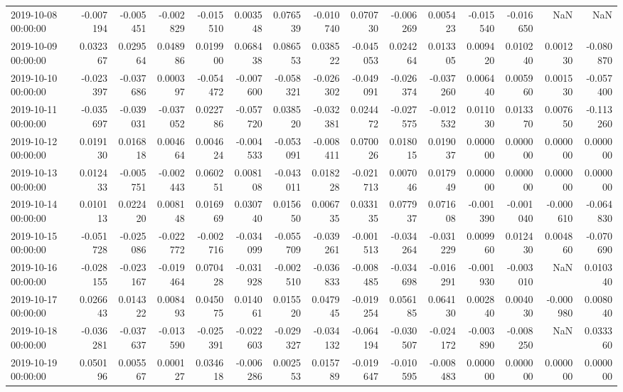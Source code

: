 \begin{tabular}{lrrrrrrrrrrrrrr}
2019-10-08 00:00:00 & -0.007194 & -0.005451 & -0.002829 & -0.015510 & 0.003548 & 0.076539 & -0.010740 & 0.070730 & -0.006269 & 0.005423 & -0.015540 & -0.016650 & NaN & NaN \\
2019-10-09 00:00:00 & 0.032367 & 0.029564 & 0.048986 & 0.019900 & 0.068438 & 0.086553 & 0.038522 & -0.045053 & 0.024264 & 0.013305 & 0.009420 & 0.010240 & 0.001230 & -0.080870 \\
2019-10-10 00:00:00 & -0.023397 & -0.037686 & 0.000397 & -0.054472 & -0.007600 & -0.058321 & -0.026302 & -0.049091 & -0.026374 & -0.037260 & 0.006440 & 0.005960 & 0.001530 & -0.057400 \\
2019-10-11 00:00:00 & -0.035697 & -0.039031 & -0.037052 & 0.022786 & -0.057720 & 0.038520 & -0.032381 & 0.024472 & -0.027575 & -0.012532 & 0.011030 & 0.013370 & 0.007650 & -0.113260 \\
2019-10-12 00:00:00 & 0.019130 & 0.016818 & 0.004664 & 0.004624 & -0.004533 & -0.053091 & -0.008411 & 0.070026 & 0.018015 & 0.019037 & 0.000000 & 0.000000 & 0.000000 & 0.000000 \\
2019-10-13 00:00:00 & 0.012433 & -0.005751 & -0.002443 & 0.060251 & 0.008108 & -0.043011 & 0.018228 & -0.021713 & 0.007046 & 0.017949 & 0.000000 & 0.000000 & 0.000000 & 0.000000 \\
2019-10-14 00:00:00 & 0.010113 & 0.022420 & 0.008148 & 0.016969 & 0.030740 & 0.015650 & 0.006735 & 0.033135 & 0.077937 & 0.071608 & -0.001390 & -0.001040 & -0.000610 & -0.064830 \\
2019-10-15 00:00:00 & -0.051728 & -0.025086 & -0.022772 & -0.002716 & -0.034099 & -0.055709 & -0.039261 & -0.001513 & -0.034264 & -0.031229 & 0.009960 & 0.012430 & 0.004860 & -0.070690 \\
2019-10-16 00:00:00 & -0.028155 & -0.023167 & -0.019464 & 0.070428 & -0.031928 & -0.002510 & -0.036833 & -0.008485 & -0.034698 & -0.016291 & -0.001930 & -0.003010 & NaN & 0.010340 \\
2019-10-17 00:00:00 & 0.026643 & 0.014322 & 0.008493 & 0.045075 & 0.014061 & 0.015520 & 0.047945 & -0.019254 & 0.056185 & 0.064130 & 0.002840 & 0.004030 & -0.000980 & 0.008040 \\
2019-10-18 00:00:00 & -0.036281 & -0.037637 & -0.013590 & -0.025391 & -0.022603 & -0.029327 & -0.034132 & -0.064194 & -0.030507 & -0.024172 & -0.003890 & -0.008250 & NaN & 0.033360 \\
2019-10-19 00:00:00 & 0.050196 & 0.005567 & 0.000127 & 0.034618 & -0.006286 & 0.002553 & 0.015789 & -0.019647 & -0.010595 & -0.008483 & 0.000000 & 0.000000 & 0.000000 & 0.000000 \\

\end{tabular}
